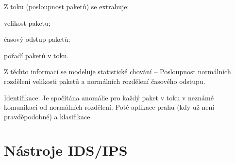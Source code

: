 \begin{compactitem}
    \item Z toku (posloupnost paketů) se extrahuje: \begin{compactitem}
        \item velikost paketu;
        \item časový odstup paketů;
        \item pořadí paketů v toku.
    \end{compactitem}
    \item Z těchto informací se modeluje statistické chování -- Posloupnost normálních rozdělení velikosti paketů a normálních rozdělení časového odstupu.
    \item Identifikace: Je spočítána anomálie pro každý paket v toku v neznámé komunikaci od normálních rozdělení. Poté aplikace prahu (kdy už není pravděpodobné) a klasifikace.
\end{compactitem}


\section{Nástroje IDS/IPS}


